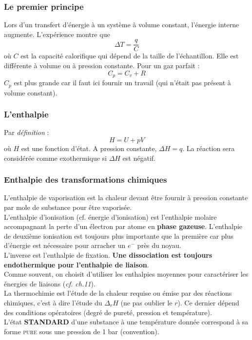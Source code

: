 \documentclass[12pt, a4paper]{article}
\begin{document}
\subsubsection{Le premier principe}
Lors d'un transfert d'énergie à un système à volume constant, l'énergie interne augmente. L'expérience montre que 
$$\Delta T = \frac{q}{C}$$
où $C$ est la capacité calorifique qui dépend de la taille de l'échantillon. Elle est différente à volume ou à pression constante. Pour un gaz parfait :
$$C_p = C_v + R$$
$C_p$ est plus grande car il faut ici fournir un travail (qui n'était pas présent à volume constant).


\subsubsection{L'enthalpie}
Par \textit{définition} : 
$$H = U + pV$$
où $H$ est une fonction d'état. A pression constante, $\Delta H = q$. La réaction sera considérée comme exothermique si $\Delta H$ est négatif.

\subsubsection{Enthalpie des transformations chimiques}
L'enthalpie de vaporisation est la chaleur devant être fournir à pression constante par mole de substance pour être vaporisée.\\

L'enthalpie d'ionisation (cf. énergie d'ionisation) est l'enthalpie molaire accompagnant la perte d'un électron par atome en \textbf{phase gazeuse}. L'enthalpie de deuxième ionisation est toujours plus importante que la première car plus d'énergie est nécessaire pour arracher un $e^-$ près du noyau.\\
L'inverse est l'enthalpie de fixation. \textbf{Une dissociation est toujours endothermique pour l'enthalpie de liaison}.\\

Comme souvent, on choisit d'utiliser les enthalpies moyennes pour caractériser les énergies de liaisons (\textit{cf. ch.11}).\\

La thermochimie est l'étude de la chaleur requise ou émise par des réactions chimiques, c'est à dire l'étude du $\Delta_r H$ (ne pas oublier le $r$). Ce dernier dépend des conditions opératoires (degré de pureté, pression et température).\\
L'état \textbf{STANDARD} d'une substance à une température donnée correspond à sa forme \textsc{pure} sous une pression de 1 bar (convention).\\
\end{document}
